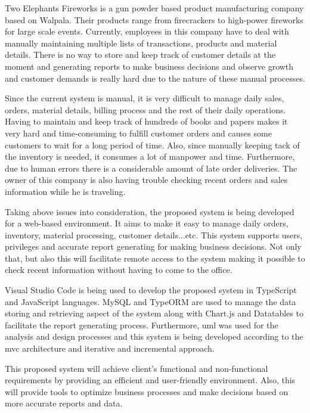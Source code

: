 \documentclass[12pt]{report}
\begin{document}
Two Elephants Fireworks is a gun powder based product manufacturing company based on Walpala. Their products range from
firecrackers to high-power fireworks for large scale events. Currently, employees in this company have to deal with manually maintaining multiple lists of transactions, products and material details. There is no way to store and keep track of customer details at the moment and generating reports to make business decisions and observe growth and customer demands is really hard due to the nature of these manual processes.

Since the current system is manual, it is very difficult to manage daily sales, orders, material details, billing process and the rest of their daily operations. Having to maintain and keep track of hundreds of books and papers makes it very hard and time-consuming to fulfill customer orders and causes some customers to wait for a long period of time. Also, since manually keeping tack of the inventory is needed, it consumes a lot of manpower and time. Furthermore, due to human errors there is a considerable amount of late order  deliveries. The owner of this company is also having trouble checking recent orders and sales information while he is traveling.

Taking above issues into consideration, the proposed system  is being developed for a web-based environment. It aims to make it easy to manage daily orders, inventory, material processing, customer details...etc. This system supports users, privileges and accurate report generating for making business decisions. Not only that, but also this will facilitate remote access to the system making it possible to check recent information without having to come to the office.

Visual Studio Code is being used to develop the proposed system in TypeScript and JavaScript languages. MySQL and TypeORM are used to manage the data storing and retrieving aspect of the system along with Chart.js and Datatables to facilitate the report generating process. Furthermore, \acrlong{uml} was used for the analysis and design processes and this system is being developed according to the \acrshort{mvc} architecture and iterative and incremental approach.

This proposed system will achieve client's functional and non-functional requirements by providing an efficient and user-friendly environment. Also, this will provide tools to optimize business processes and make decisions based on more accurate reports and data.
\end{document}
